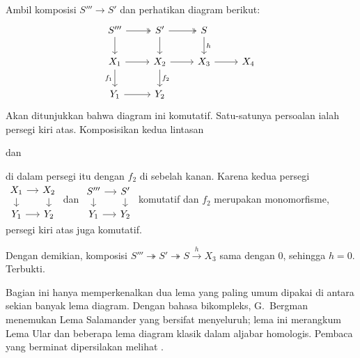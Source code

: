 \begin{bukti}
	Ambil komposisi $S''' \to S'$ dan perhatikan diagram berikut:
	\[\begin{tikzcd}
		S''' \arrow[twoheadrightarrow, r] \arrow[d] & S' \arrow[twoheadrightarrow, r] \arrow[d] & S \arrow[d, "h"] & \\
		X_1 \arrow[r] \arrow[d, "f_1"'] & X_2 \arrow[r] \arrow[d, "f_2"] & X_3 \arrow[r] & X_4 \\
		Y_1 \arrow[r] & Y_2 & &
	\end{tikzcd}\]
	Akan ditunjukkan bahwa diagram ini komutatif. Satu-satunya persoalan ialah
	persegi kiri atas. Komposisikan kedua lintasan
	dan
	di dalam persegi itu dengan $f_2$ di sebelah kanan. Karena kedua persegi
	$\begin{tikzcd}[row sep=small, column sep=small]
		X_1 \arrow[r] \arrow[d] & X_2 \arrow[d] \\
		Y_1 \arrow[r] & Y_2
	\end{tikzcd}$ dan
	$\begin{tikzcd}[row sep=small, column sep=small]
		S''' \arrow[r] \arrow[d] & S' \arrow[d] \\
		Y_1 \arrow[r] & Y_2
	\end{tikzcd}$
	komutatif dan $f_2$ merupakan monomorfisme, persegi kiri atas juga
	komutatif.
	
	Dengan demikian, komposisi
	$S''' \twoheadrightarrow S' \twoheadrightarrow S \xrightarrow{h} X_3$
	sama dengan $0$, sehingga $h=0$. Terbukti.
\end{bukti}

Bagian ini hanya memperkenalkan dua lema yang paling umum dipakai di antara
sekian banyak lema diagram. Dengan bahasa bikompleks, G.\ Bergman
menemukan Lema Salamander yang bersifat menyeluruh; lema ini merangkum Lema Ular
dan beberapa lema diagram klasik dalam aljabar homologis. Pembaca yang
berminat dipersilakan melihat \cite{Be12}.
